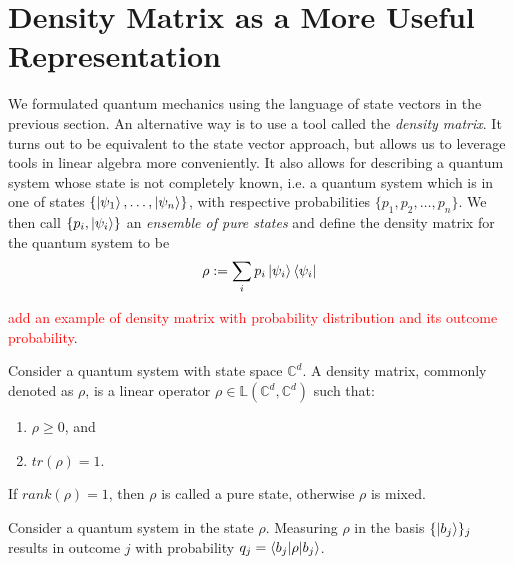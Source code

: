
\chapter{Density Matrix as a More Useful Representation} %

\label{Chapter4-density matrix} %

We formulated quantum mechanics using the language of state vectors in the previous section. An alternative way is to use a tool called the \textit{density matrix}. It turns out to be equivalent to the state vector approach, but allows us to leverage tools in linear algebra more conveniently. It also allows for describing a quantum system whose state is not completely known, i.e. a quantum system which is in one of states $\{\ket{\psi_1},\hdots,\ket{\psi_n}\}$, with respective probabilities $\{p_1, p_2, \hdots, p_n\}$. We then call $\{p_i, \ket{\psi_i}\}$ an \textit{ensemble of pure states} and define the density matrix for the quantum system to be
\begin{equation}
    \rho:=\sum_i p_i \ket{\psi_i}\bra{\psi_i}
\end{equation}

\textcolor{red}{add an example of density matrix with probability distribution and its outcome probability}.

\begin{definition}
 Consider a quantum system with state space $\mathbb{C}^d$. A density matrix, commonly denoted as $\rho$, is a linear operator $\rho \in \mathbb{L}(\mathbb{C}^d, \mathbb{C}^d)$ such that:
 \begin{enumerate}
     \item $\rho \geq 0$, and
     \item $tr(\rho)=1$.
 \end{enumerate}
 
 If $rank(\rho)=1$, then $\rho$ is called a pure state, otherwise $\rho$ is mixed.
\end{definition}

\begin{definition}
Consider a quantum system in the state $\rho$. Measuring $\rho$ in the basis $\{\ket{b_j}\}_j$ results in outcome $j$ with probability $q_j=\braket{b_j | \rho |b_j}$.
\end{definition}

